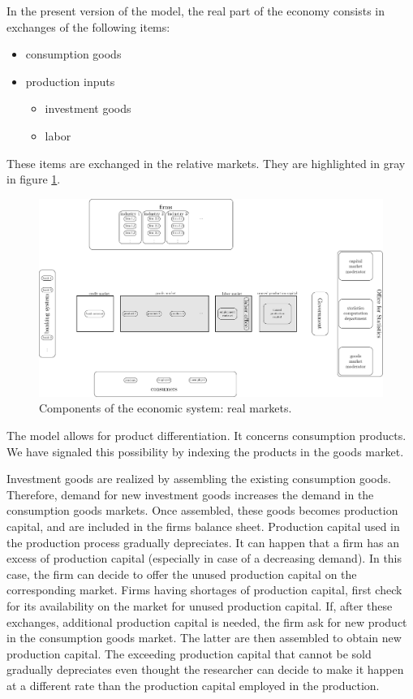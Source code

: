 \documentclass{book}
\begin{document}
In the present version of the model, the real part of the economy consists in exchanges of the following items:
\begin{itemize}
	\item consumption goods
	\item production inputs
		\begin{itemize}
			\item investment goods
			\item labor
		\end{itemize}
\end{itemize}

These items are exchanged in the relative markets. They are highlighted in gray in figure \ref{fig:componentsc2}.


\begin{figure}[htp]
\hskip-1cm\includegraphics[scale=0.5]{agents_and_interactions_figure1c2-0.pdf}
	\caption{Components of the economic system: real markets.}
	\label{fig:componentsc2}
\end{figure}

The model allows for product differentiation. It concerns consumption products. We have signaled this possibility by indexing the products in the goods market.

Investment goods are realized by assembling the existing consumption goods. Therefore, demand for new investment goods increases the demand in the consumption goods markets. Once assembled, these goods becomes production capital, and are included in the firms balance sheet. Production capital used in the production process gradually depreciates. It can happen that a firm has an excess of production capital (especially in case of a decreasing demand). In this case, the firm can decide to offer the unused production capital on the corresponding market. 
Firms having shortages of production capital, first check for its availability on the market for unused production capital. If, after these exchanges, additional production capital is needed, the firm ask for new product in the consumption goods market. The latter are then assembled to obtain new production capital. The exceeding production capital that cannot be sold gradually depreciates even thought the researcher can decide to make it happen at a different rate than the production capital employed in the production.
\end{document}
